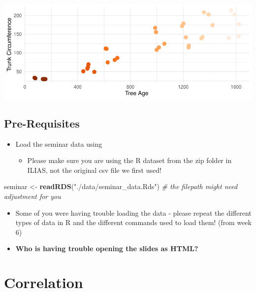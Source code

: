 \documentclass[
]{book}
\newenvironment{Shaded}{\begin{snugshade}}{\end{snugshade}}
\newcommand{\CommentTok}[1]{\textcolor[rgb]{0.56,0.35,0.01}{\textit{#1}}}
\newcommand{\FunctionTok}[1]{\textcolor[rgb]{0.13,0.29,0.53}{\textbf{#1}}}
\newcommand{\NormalTok}[1]{#1}
\newcommand{\OtherTok}[1]{\textcolor[rgb]{0.56,0.35,0.01}{#1}}
\newcommand{\StringTok}[1]{\textcolor[rgb]{0.31,0.60,0.02}{#1}}
\providecommand{\tightlist}{%
  \setlength{\itemsep}{0pt}\setlength{\parskip}{0pt}}
\begin{document}
\includegraphics{_main_files/figure-latex/unnamed-chunk-73-1.pdf}

\subsection{Pre-Requisites}\label{pre-requisites-1}

\begin{itemize}
\tightlist
\item
  Load the seminar data using

  \begin{itemize}
  \tightlist
  \item
    Please make sure you are using the R dataset from the
    zip folder in ILIAS, not the original csv file we first used!
  \end{itemize}
\end{itemize}

\begin{Shaded}
\begin{Highlighting}[]
\NormalTok{seminar }\OtherTok{\textless{}{-}} \FunctionTok{readRDS}\NormalTok{(}\StringTok{"./data/seminar\_data.Rds"}\NormalTok{) }\CommentTok{\# the filepath might need adjustment for you}
\end{Highlighting}
\end{Shaded}

\begin{itemize}
\tightlist
\item
  Some of you were having trouble loading the data - please repeat the different types of data in R and the different commands used to load them! (from week 6)
\item
  \textbf{Who is having trouble opening the slides as HTML?}
\end{itemize}

\section{Correlation}\label{correlation}
\end{document}
